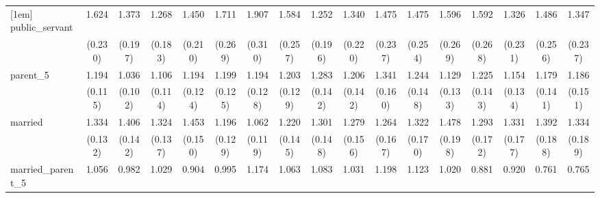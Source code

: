 {\begin{tabular}{l*{16}{c}}
[1em]
public\_servant      &       1.624\sym{***}&       1.373\sym{*}  &       1.268         &       1.450\sym{*}  &       1.711\sym{***}&       1.907\sym{***}&       1.584\sym{**} &       1.252         &       1.340         &       1.475\sym{*}  &       1.475\sym{*}  &       1.596\sym{**} &       1.592\sym{**} &       1.326         &       1.486\sym{*}  &       1.347         \\
                    &     (0.230)         &     (0.197)         &     (0.183)         &     (0.210)         &     (0.269)         &     (0.310)         &     (0.257)         &     (0.196)         &     (0.220)         &     (0.237)         &     (0.254)         &     (0.269)         &     (0.268)         &     (0.231)         &     (0.256)         &     (0.237)         \\
[1em]
parent\_5            &       1.194         &       1.036         &       1.106         &       1.194         &       1.199         &       1.194         &       1.203         &       1.283\sym{*}  &       1.206         &       1.341\sym{*}  &       1.244         &       1.129         &       1.225         &       1.154         &       1.179         &       1.186         \\
                    &     (0.115)         &     (0.102)         &     (0.114)         &     (0.124)         &     (0.125)         &     (0.128)         &     (0.129)         &     (0.142)         &     (0.142)         &     (0.160)         &     (0.148)         &     (0.133)         &     (0.143)         &     (0.134)         &     (0.141)         &     (0.151)         \\
[1em]
married             &       1.334\sym{**} &       1.406\sym{***}&       1.324\sym{**} &       1.453\sym{***}&       1.196         &       1.062         &       1.220         &       1.301\sym{*}  &       1.279\sym{*}  &       1.264         &       1.322\sym{*}  &       1.478\sym{**} &       1.293         &       1.331\sym{*}  &       1.392\sym{*}  &       1.334\sym{*}  \\
                    &     (0.132)         &     (0.142)         &     (0.137)         &     (0.150)         &     (0.129)         &     (0.119)         &     (0.145)         &     (0.148)         &     (0.156)         &     (0.167)         &     (0.170)         &     (0.198)         &     (0.172)         &     (0.177)         &     (0.188)         &     (0.189)         \\
[1em]
married\_parent\_5    &       1.056         &       0.982         &       1.029         &       0.904         &       0.995         &       1.174         &       1.063         &       1.083         &       1.031         &       1.198         &       1.123         &       1.020         &       0.881         &       0.920         &       0.761         &       0.765         \\

\end{tabular}}
